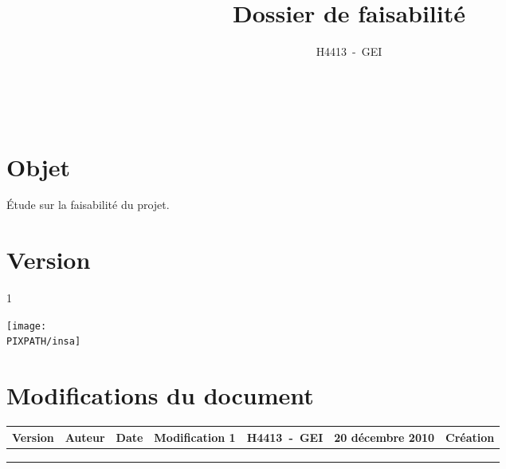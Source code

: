 \documentclass[twoside]{article}
\title{Dossier de faisabilité}
\author{H4413~-~GEI}
\newcommand\PIXPATH{./docs/pics}
\newcommand\Object{Étude sur la faisabilité du projet.}
\newcommand\Version{1}
\begin{document}



\maketitle

\thispagestyle{empty}

\hfill\\
\vfill

\section*{Objet}
\Object

\section*{Version}
\Version

\begin{center}
    \texttt{[image: \\PIXPATH/insa]}\hfill\\
\end{center}

\pagebreak



\section*{Modifications du document}

\begin{center}
\begin{longtable}{|m{14mm}||m{36mm}|m{36mm}|m{60mm}|}
\hline
Version & Auteur & Date & Modification\endhead \hline
1
& %
H4413~-~GEI
& %
20 décembre 2010
& %
Création
\\\hline

& %

& %

& %

\\\hline

& %

& %

& %

\\\hline

& %

& %

& %

\\\hline
\end{longtable}
\end{center}
\end{document}
